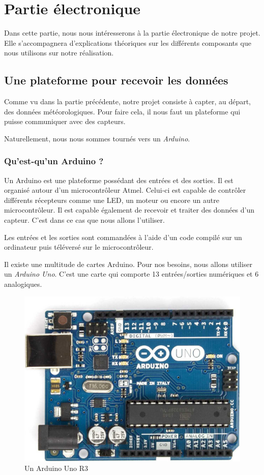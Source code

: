 \chapter{Partie électronique}

Dans cette partie, nous nous intéresserons à la partie électronique de notre projet. Elle s'accompagnera d'explications théoriques sur les différents composants que nous utilisons sur notre réalisation.

\section{Une plateforme pour recevoir les données}

Comme vu dans la partie précédente, notre projet consiste à capter, au départ, des données météorologiques. Pour faire cela, il nous faut un plateforme qui puisse communiquer avec des capteurs.

Naturellement, nous nous sommes tournés vers un \emph{Arduino}.

\subsection{Qu'est-qu'un Arduino ?}

Un Arduino est une plateforme possédant des entrées et des sorties. Il est organisé autour d'un microcontrôleur Atmel. Celui-ci est capable de contrôler différents récepteurs comme une LED, un moteur ou encore un autre microcontrôleur. Il est capable également de recevoir et traiter des données d'un capteur. C'est dans ce cas que nous allons l'utiliser.

Les entrées et les sorties sont commandées à l'aide d'un code compilé sur un ordinateur puis téléversé sur le microcontrôleur.

Il existe une multitude de cartes Arduino. Pour nos besoins, nous allons utiliser un \emph{Arduino Uno}. C'est une carte qui comporte 13 entrées/sorties numériques et 6 analogiques.

\begin{figure}[!h]
	\centering
	\includegraphics[width=.4\linewidth]{Images/Arduino_Uno}
	\caption{Un Arduino Uno R3}
\end{figure}

